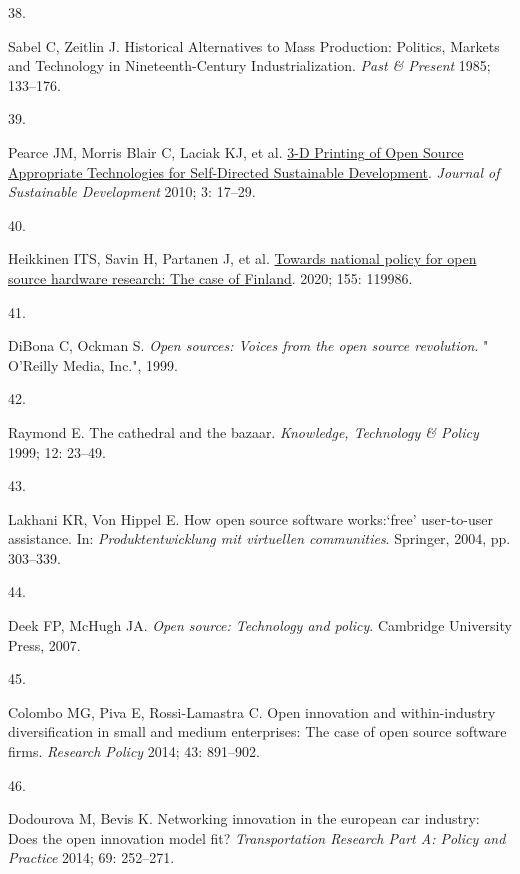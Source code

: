 \documentclass[
  12pt,
  a4paperpaper,
  onecolumn]{article}
\newlength{\cslhangindent}
\newlength{\csllabelwidth}
\newlength{\cslentryspacingunit} %
\newenvironment{CSLReferences}[2] %
 {%
  \setlength{\parindent}{0pt}
  \ifodd #1
  \let\oldpar\par
  \def\par{\hangindent=\cslhangindent\oldpar}
  \fi
  \setlength{\parskip}{#2\cslentryspacingunit}
 }%
 {}
\newcommand{\CSLLeftMargin}[1]{\parbox[t]{\csllabelwidth}{#1}}
\newcommand{\CSLRightInline}[1]{\parbox[t]{\linewidth - \csllabelwidth}{#1}\break}
\begin{document}
\begin{CSLReferences}{0}{0}
\leavevmode{}%
\CSLLeftMargin{38. }%
\CSLRightInline{Sabel C, Zeitlin J. Historical {Alternatives} to {Mass
Production}: {Politics}, {Markets} and {Technology} in
{Nineteenth-Century Industrialization}. \emph{Past \& Present} 1985;
133--176.}

\leavevmode{}%
\CSLLeftMargin{39. }%
\CSLRightInline{Pearce JM, Morris Blair C, Laciak KJ, et al.
\href{https://doi.org/10.5539/jsd.v3n4p17}{3-{D Printing} of {Open
Source Appropriate Technologies} for {Self-Directed Sustainable
Development}}. \emph{Journal of Sustainable Development} 2010; 3:
17--29.}

\leavevmode{}%
\CSLLeftMargin{40. }%
\CSLRightInline{Heikkinen ITS, Savin H, Partanen J, et al.
\href{https://doi.org/10.1016/j.techfore.2020.119986}{Towards national
policy for open source hardware research: {The} case of {Finland}}.
2020; 155: 119986.}

\leavevmode{}%
\CSLLeftMargin{41. }%
\CSLRightInline{DiBona C, Ockman S. \emph{Open sources: Voices from the
open source revolution}. " O'Reilly Media, Inc.", 1999.}

\leavevmode{}%
\CSLLeftMargin{42. }%
\CSLRightInline{Raymond E. The cathedral and the bazaar.
\emph{Knowledge, Technology \& Policy} 1999; 12: 23--49.}

\leavevmode{}%
\CSLLeftMargin{43. }%
\CSLRightInline{Lakhani KR, Von Hippel E. How open source software
works:{`free'} user-to-user assistance. In: \emph{Produktentwicklung mit
virtuellen communities}. Springer, 2004, pp. 303--339.}

\leavevmode{}%
\CSLLeftMargin{44. }%
\CSLRightInline{Deek FP, McHugh JA. \emph{Open source: Technology and
policy}. Cambridge University Press, 2007.}

\leavevmode{}%
\CSLLeftMargin{45. }%
\CSLRightInline{Colombo MG, Piva E, Rossi-Lamastra C. Open innovation
and within-industry diversification in small and medium enterprises: The
case of open source software firms. \emph{Research Policy} 2014; 43:
891--902.}

\leavevmode{}%
\CSLLeftMargin{46. }%
\CSLRightInline{Dodourova M, Bevis K. Networking innovation in the
european car industry: Does the open innovation model fit?
\emph{Transportation Research Part A: Policy and Practice} 2014; 69:
252--271.}


\end{CSLReferences}
\end{document}
